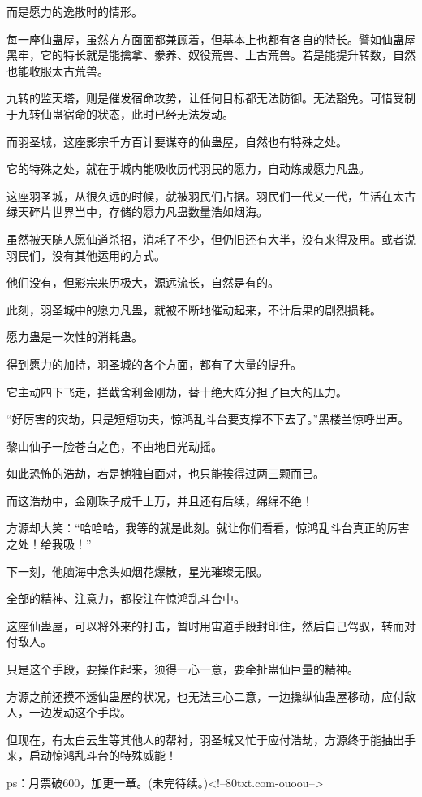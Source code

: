 \begin{this_body}
而是愿力的逸散时的情形。

每一座仙蛊屋，虽然方方面面都兼顾着，但基本上也都有各自的特长。譬如仙蛊屋黑牢，它的特长就是能擒拿、豢养、奴役荒兽、上古荒兽。若是能提升转数，自然也能收服太古荒兽。

九转的监天塔，则是催发宿命攻势，让任何目标都无法防御。无法豁免。可惜受制于九转仙蛊宿命的状态，此时已经无法发动。

而羽圣城，这座影宗千方百计要谋夺的仙蛊屋，自然也有特殊之处。

它的特殊之处，就在于城内能吸收历代羽民的愿力，自动炼成愿力凡蛊。

这座羽圣城，从很久远的时候，就被羽民们占据。羽民们一代又一代，生活在太古绿天碎片世界当中，存储的愿力凡蛊数量浩如烟海。

虽然被天随人愿仙道杀招，消耗了不少，但仍旧还有大半，没有来得及用。或者说羽民们，没有其他运用的方式。

他们没有，但影宗来历极大，源远流长，自然是有的。

此刻，羽圣城中的愿力凡蛊，就被不断地催动起来，不计后果的剧烈损耗。

愿力蛊是一次性的消耗蛊。

得到愿力的加持，羽圣城的各个方面，都有了大量的提升。

它主动四下飞走，拦截舍利金刚劫，替十绝大阵分担了巨大的压力。

“好厉害的灾劫，只是短短功夫，惊鸿乱斗台要支撑不下去了。”黑楼兰惊呼出声。

黎山仙子一脸苍白之色，不由地目光动摇。

如此恐怖的浩劫，若是她独自面对，也只能挨得过两三颗而已。

而这浩劫中，金刚珠子成千上万，并且还有后续，绵绵不绝！

方源却大笑：“哈哈哈，我等的就是此刻。就让你们看看，惊鸿乱斗台真正的厉害之处！给我吸！”

下一刻，他脑海中念头如烟花爆散，星光璀璨无限。

全部的精神、注意力，都投注在惊鸿乱斗台中。

这座仙蛊屋，可以将外来的打击，暂时用宙道手段封印住，然后自己驾驭，转而对付敌人。

只是这个手段，要操作起来，须得一心一意，要牵扯蛊仙巨量的精神。

方源之前还摸不透仙蛊屋的状况，也无法三心二意，一边操纵仙蛊屋移动，应付敌人，一边发动这个手段。

但现在，有太白云生等其他人的帮衬，羽圣城又忙于应付浩劫，方源终于能抽出手来，启动惊鸿乱斗台的特殊威能！

ps：月票破600，加更一章。(未完待续。)<!--80txt.com-ouoou-->

\end{this_body}

